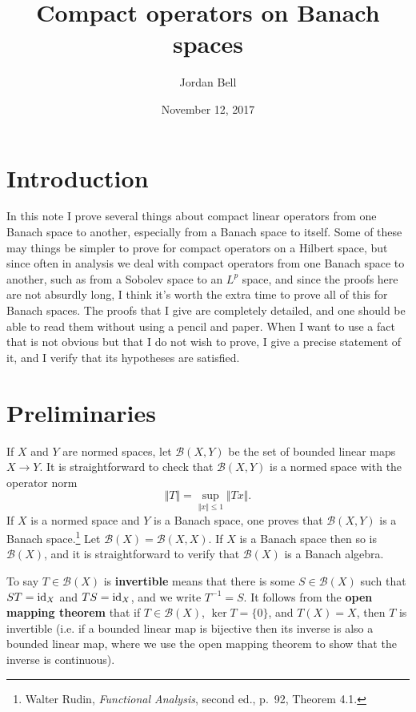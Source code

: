 \documentclass{article}
\newcommand{\id}{\ensuremath\mathrm{id}}
\newcommand{\norm}[1]{\Vert #1 \Vert}
\theoremstyle{definition}
\begin{document}
\title{Compact operators on Banach spaces}
\author{Jordan Bell}
\date{November 12, 2017}

\maketitle

\section{Introduction}
In this note I prove several things about compact linear operators from one Banach space to another,  especially from a Banach space to itself.
Some of these may things be simpler to prove for compact  operators on a Hilbert space, but since often in analysis we deal with compact 
operators from one Banach space to another, such as from a Sobolev space to an $L^p$ space, and since the proofs here are not absurdly long,
I think it's worth the extra time to prove all of this for Banach spaces. The proofs that I  give are completely detailed, and one should be able to read them
without using a pencil and paper. When I want to use a fact that is not obvious but that I do not wish to prove, I give a precise statement of it, and
 I verify that its hypotheses are satisfied.

\section{Preliminaries}
If $X$ and $Y$ are normed spaces, let $\mathscr{B}(X,Y)$ be the set of bounded linear maps $X \to Y$. It is straightforward to check that $\mathscr{B}(X,Y)$ is a normed space with the operator
norm
\[
\norm{T} = \sup_{\norm{x} \leq 1} \norm{Tx}.
\]
If $X$ is a normed space and $Y$ is a Banach space, one proves that $\mathscr{B}(X,Y)$ is a Banach space.\footnote{Walter Rudin, {\em Functional Analysis}, second ed.,
p.~92, Theorem 4.1.} Let $\mathscr{B}(X)=\mathscr{B}(X,X)$. If $X$ is a Banach space then so is $\mathscr{B}(X)$, and it is straightforward to verify that $\mathscr{B}(X)$ is a Banach algebra.

To say $T \in \mathscr{B}(X)$ is \textbf{invertible} means that there is some $S \in \mathscr{B}(X)$ such that $ST=\id_X$ and
 $TS = \id_X$, and we write $T^{-1}=S$. It follows from the \textbf{open
mapping theorem} that if $T \in \mathscr{B}(X)$, $\ker T = \{0\}$, and $T(X)=X$, then $T$ is invertible (i.e. if a bounded linear map is bijective then
its inverse is also a bounded linear map, where we use the open mapping theorem to show that the inverse is continuous).
\end{document}
